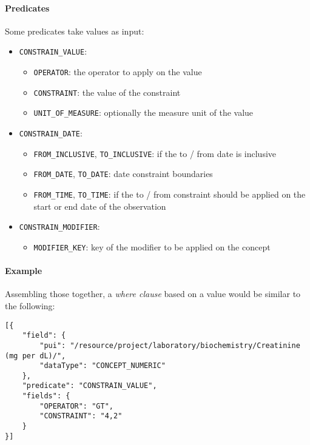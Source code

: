 \paragraph{Predicates}
Some predicates take values as input:
\begin{itemize}
    \setlength\itemsep{0em}

    \item \verb|CONSTRAIN_VALUE|:
    \begin{itemize}
        \item \verb|OPERATOR|: the operator to apply on the value 
        \item \verb|CONSTRAINT|: the value of the constraint
        \item \verb|UNIT_OF_MEASURE|: optionally the measure unit of the value
    \end{itemize}
    
    \item \verb|CONSTRAIN_DATE|:
    \begin{itemize}
        \item \verb|FROM_INCLUSIVE|, \verb|TO_INCLUSIVE|: if the to / from date is inclusive
        \item \verb|FROM_DATE|, \verb|TO_DATE|: date constraint boundaries
        \item \verb|FROM_TIME|, \verb|TO_TIME|: if the to / from constraint should be applied on the start or end date of the observation
    \end{itemize}
    
    \item \verb|CONSTRAIN_MODIFIER|:
    \begin{itemize}
        \item \verb|MODIFIER_KEY|: key of the modifier to be applied on the concept
    \end{itemize}
\end{itemize}

\paragraph{Example}
Assembling those together, a \emph{where clause} based on a value would be similar to the following:
\begin{samepage}
\begin{verbatim}
[{
    "field": {
        "pui": "/resource/project/laboratory/biochemistry/Creatinine (mg per dL)/",
        "dataType": "CONCEPT_NUMERIC"
    },
    "predicate": "CONSTRAIN_VALUE",
    "fields": {
        "OPERATOR": "GT",
        "CONSTRAINT": "4,2"
    }
}]
\end{verbatim}
\end{samepage}

